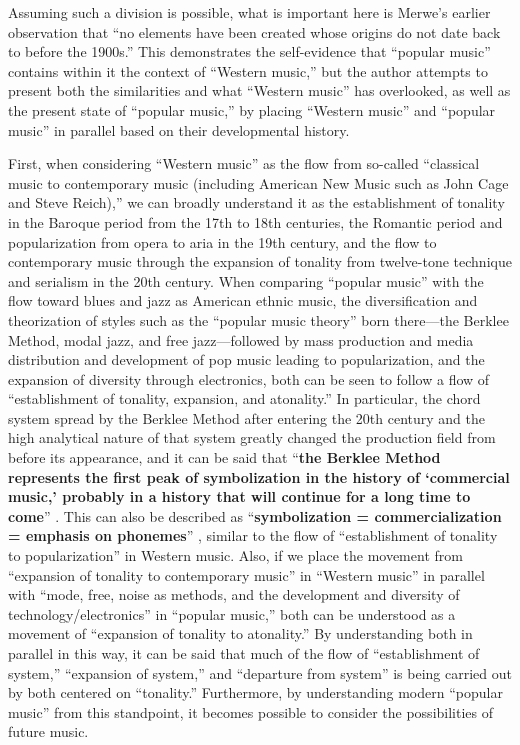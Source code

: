Assuming such a division is possible, what is important here is Merwe's earlier observation that ``no elements have been created whose origins do not date back to before the 1900s.'' This demonstrates the self-evidence that ``popular music'' contains within it the context of ``Western music,'' but the author attempts to present both the similarities and what ``Western music'' has overlooked, as well as the present state of ``popular music,'' by placing ``Western music'' and ``popular music'' in parallel based on their developmental history.

First, when considering ``Western music'' as the flow from so-called ``classical music to contemporary music (including American New Music such as John Cage and Steve Reich),'' we can broadly understand it as the establishment of tonality in the Baroque period from the 17th to 18th centuries, the Romantic period and popularization from opera to aria in the 19th century, and the flow to contemporary music through the expansion of tonality from twelve-tone technique and serialism in the 20th century. When comparing ``popular music'' with the flow toward blues and jazz as American ethnic music, the diversification and theorization of styles such as the ``popular music theory'' born there—the Berklee Method, modal jazz, and free jazz—followed by mass production and media distribution and development of pop music leading to popularization, and the expansion of diversity through electronics, both can be seen to follow a flow of ``establishment of tonality, expansion, and atonality.'' In particular, the chord system spread by the Berklee Method after entering the 20th century and the high analytical nature of that system greatly changed the production field from before its appearance, and it can be said that ``{\bf the Berklee Method represents the first peak of symbolization in the history of `commercial music,' probably in a history that will continue for a long time to come}'' \cite{kikuchi-ootani:01}. This can also be described as ``{\bf symbolization = commercialization = emphasis on phonemes}'' \cite{kikuchi-ootani:01}, similar to the flow of ``establishment of tonality to popularization'' in Western music. Also, if we place the movement from ``expansion of tonality to contemporary music'' in ``Western music'' in parallel with ``mode, free, noise as methods, and the development and diversity of technology/electronics'' in ``popular music,'' both can be understood as a movement of ``expansion of tonality to atonality.'' By understanding both in parallel in this way, it can be said that much of the flow of ``establishment of system,'' ``expansion of system,'' and ``departure from system'' is being carried out by both centered on ``tonality.'' Furthermore, by understanding modern ``popular music'' from this standpoint, it becomes possible to consider the possibilities of future music.


